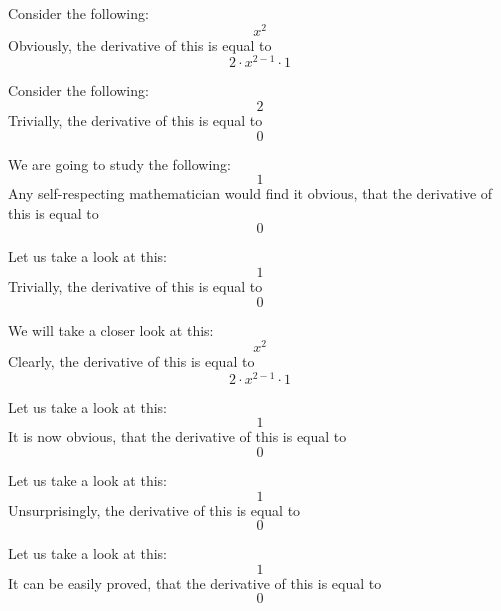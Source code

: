 \documentclass{article}
\begin{document}
Consider the following:
\begin{equation}
x ^{2 } 
\end{equation}
Obviously, the derivative of this is equal to
\begin{equation}
2 \cdot x ^{2 - 1 } \cdot 1 
\end{equation}

Consider the following:
\begin{equation}
2 
\end{equation}
Trivially, the derivative of this is equal to
\begin{equation}
0 
\end{equation}

We are going to study the following:
\begin{equation}
1 
\end{equation}
Any self-respecting mathematician would find it obvious, that the derivative of this is equal to
\begin{equation}
0 
\end{equation}

Let us take a look at this:
\begin{equation}
1 
\end{equation}
Trivially, the derivative of this is equal to
\begin{equation}
0 
\end{equation}

We will take a closer look at this:
\begin{equation}
x ^{2 } 
\end{equation}
Clearly, the derivative of this is equal to
\begin{equation}
2 \cdot x ^{2 - 1 } \cdot 1 
\end{equation}

Let us take a look at this:
\begin{equation}
1 
\end{equation}
It is now obvious, that the derivative of this is equal to
\begin{equation}
0 
\end{equation}

Let us take a look at this:
\begin{equation}
1 
\end{equation}
Unsurprisingly, the derivative of this is equal to
\begin{equation}
0 
\end{equation}

Let us take a look at this:
\begin{equation}
1 
\end{equation}
It can be easily proved, that the derivative of this is equal to
\begin{equation}
0 
\end{equation}
\end{document}
